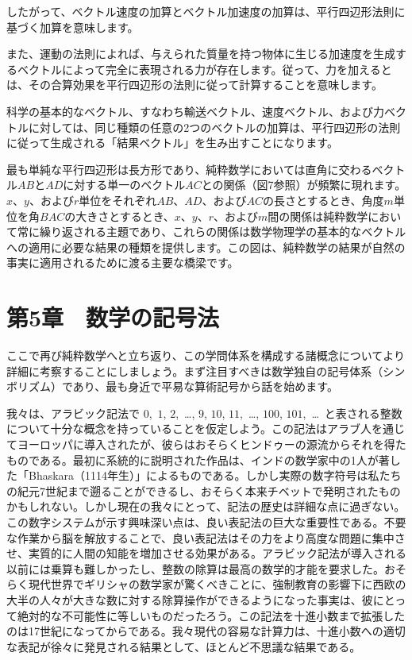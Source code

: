 \documentclass[a4paper,11pt,openany]{ltjsbook}
\providecommand{\Chg}[2]{#2}
\providecommand{\Add}[1]{\Chg{}{#1}}
\begin{document}
したがって、ベクトル速度の加算とベクトル加速度の加算は、平行四辺形法則に基づく加算を意味します。

また、運動の法則によれば、与えられた質量を持つ物体に生じる加速度を生成するベクトルによって完全に表現される力が存在します。従って、力を加えるとは、その合算効果を平行四辺形の法則に従って計算することを意味します。

科学の基本的なベクトル、すなわち輸送ベクトル、速度ベクトル、および力ベクトルに対しては、同じ種類の任意の2つのベクトルの加算は、平行四辺形の法則に従って生成される「結果ベクトル」を生み出すことになります。

最も単純な平行四辺形は長方形であり、純粋数学においては直角に交わるベクトル$AB$と$AD$に対する単一のベクトル$AC$との関係（図7参照）が頻繁に現れます。$x$、$y$、および$r$単位をそれぞれ$AB$、$AD$、および$AC$の長さとするとき、角度$m$単位を角$BAC$の大きさとするとき、$x$、$y$、$r$、および$m$間の関係は純粋数学において常に繰り返される主題であり、これらの関係は数学物理学の基本的なベクトルへの適用に必要な結果の種類を提供します。この図は、純粋数学の結果が自然の事実に適用されるために渡る主要な橋梁です。

\chapter{第5章　数学の記号法}

ここで再び純粋数学へと立ち返り、この学問体系を構成する諸概念についてより詳細に考察することにしましょう。まず注目すべきは数学独自の記号体系（シンボリズム）であり、最も身近で平易な算術記号から話を始めます。

我々は、アラビック記法で $0$,~$1$, $2$,~\dots, $9$, $10$, $11$,~\dots\Add{,} $100$, $101$,~\dots\ と表される整数について十分な概念を持っていることを仮定しよう。この記法はアラブ人を通じてヨーロッパに導入されたが、彼らはおそらくヒンドゥーの源流からそれを得たものである。最初に系統的に説明された作品は、インドの数学家中の1人が著した「Bhaskara（1114年生）」によるものである。しかし実際の数字符号は私たちの紀元7世紀まで遡ることができるし、おそらく本来チベットで発明されたものかもしれない。しかし現在の我々にとって、記法の歴史は詳細な点に過ぎない。この数字システムが示す興味深い点は、良い表記法の巨大な重要性である。不要な作業から脳を解放することで、良い表記法はその力をより高度な問題に集中させ、実質的に人間の知能を増加させる効果がある。アラビック記法が導入される以前には乗算も難しかったし、整数の除算は最高の数学的才能を要求した。おそらく現代世界でギリシャの数学家が驚くべきことに、強制教育の影響下に西欧の大半の人々が大きな数に対する除算操作ができるようになった事実は、彼にとって絶対的な不可能性に等しいものだったろう。この記法を十進小数まで拡張したのは17世紀になってからである。我々現代の容易な計算力は、十進小数への適切な表記が徐々に発見される結果として、ほとんど不思議な結果である。
\end{document}

